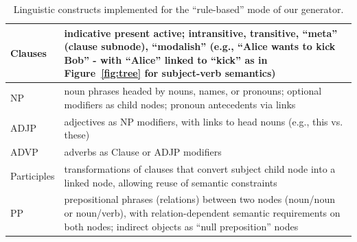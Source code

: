 {%




%
\begin{table}[ht]
\centering
\begin{tabularx}{\linewidth}{ |l|X| }
\hline
Clauses & indicative present active; intransitive, transitive, ``meta'' (clause subnode), ``modalish'' (e.g., ``Alice wants to kick Bob'' - with ``Alice'' linked to ``kick'' as in Figure~\ref{fig:tree} for subject-verb semantics) \\ \hline %
NP & noun phrases headed by nouns, names, or pronouns; optional modifiers as child nodes; pronoun antecedents via links \\ \hline
ADJP & adjectives as NP modifiers, with links to head nouns (e.g., this vs. these) \\ \hline
ADVP & adverbs as Clause or ADJP modifiers \\ \hline
Participles & transformations of clauses that convert subject child node into a linked node, allowing reuse of semantic constraints \\ \hline
PP & prepositional phrases (relations) between two nodes (noun/noun or noun/verb), with relation-dependent semantic requirements on both nodes; indirect objects as ``null preposition'' nodes \\ \hline
\end{tabularx}
\caption{ 
    Linguistic constructs implemented for the ``rule-based'' mode of our generator.
}
\label{tab:implemented_linguistics}
\end{table}



%






} %
